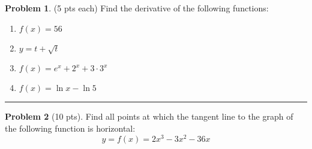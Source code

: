 \documentclass[12pt]{article}
\theoremstyle{definition}
\newtheorem{problem}{Problem}
\begin{document}
\bigskip

\begin{problem}(5 pts each)
  Find the derivative of the following functions:
  \begin{enumerate}
  \item $f(x) = 56$
    \begin{flushright}
    \end{flushright}
  \item $y = t + \sqrt{t}$
    \begin{flushright}
    \end{flushright}
  \item $f(x) = e^x + 2^x + 3 \cdot 3^x$
    \begin{flushright}
    \end{flushright}
  \item $f(x) = \ln x - \ln 5$
    \begin{flushright}
    \end{flushright}
  \end{enumerate}
\end{problem}
\hrule

\begin{problem}[10 pts]
  Find all points at which the tangent line to the graph of the following function is horizontal:
  \begin{equation*}
    y = f(x) = 2x^3 - 3x^2 - 36x
  \end{equation*}

  \vspace{7cm}
  \begin{flushright}
  \end{flushright}
\end{problem}
\newpage
\end{document}
